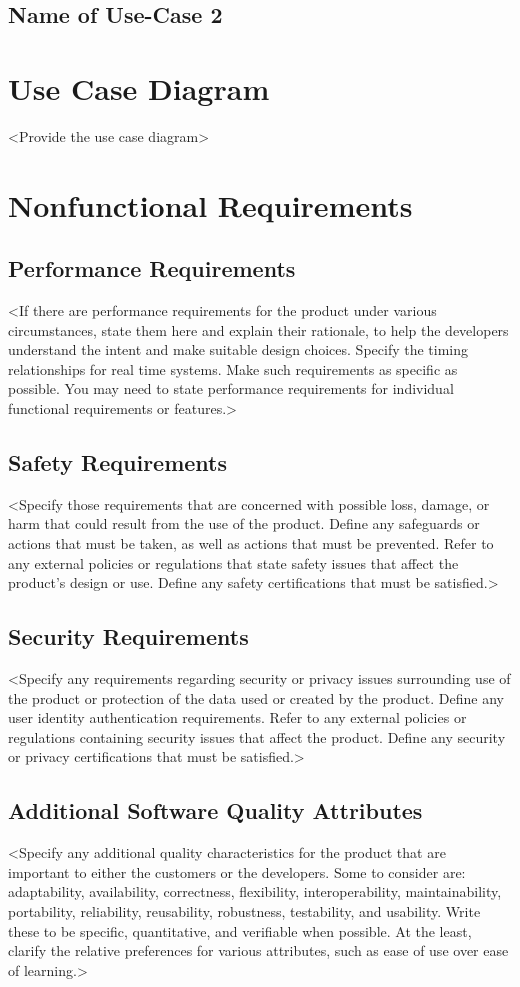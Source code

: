 \subsection{Name of Use-Case 2}

\section{Use Case Diagram}
<Provide the use case diagram>

\section{Nonfunctional Requirements}
\subsection{Performance Requirements}
<If there are performance requirements for the product under various circumstances, state them here and explain their rationale, to help the developers understand the intent and make suitable design choices. Specify the timing relationships for real time systems. Make such requirements as specific as possible. You may need to state performance requirements for individual functional requirements or features.>

\subsection{Safety Requirements}
<Specify those requirements that are concerned with possible loss, damage, or harm that could result from the use of the product. Define any safeguards or actions that must be taken, as well as actions that must be prevented. Refer to any external policies or regulations that state safety issues that affect the product’s design or use. Define any safety certifications that must be satisfied.>

\subsection{Security Requirements}
<Specify any requirements regarding security or privacy issues surrounding use of the product or protection of the data used or created by the product. Define any user identity authentication requirements. Refer to any external policies or regulations containing security issues that affect the product. Define any security or privacy certifications that must be satisfied.>

\subsection{Additional Software Quality Attributes}
<Specify any additional quality characteristics for the product that are important to either the customers or the developers. Some to consider are: adaptability, availability, correctness, flexibility, interoperability, maintainability, portability, reliability, reusability, robustness, testability, and usability. Write these to be specific, quantitative, and verifiable when possible. At the least, clarify the relative preferences for various attributes, such as ease of use over ease of learning.>

